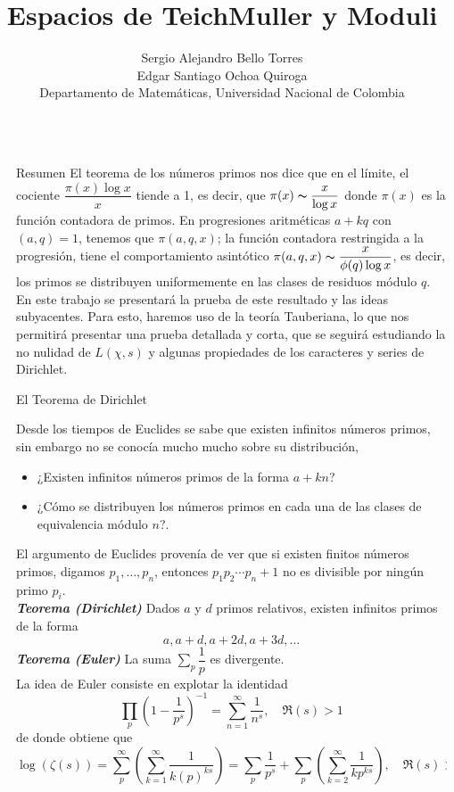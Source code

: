 \documentclass[final]{beamer}
\title{\Huge Espacios de TeichMuller y Moduli}
\author{\Large Sergio Alejandro Bello Torres\\Edgar Santiago Ochoa Quiroga\\Departamento de Matemáticas, Universidad Nacional de Colombia}
\newlength{\sepwidth}
\newlength{\colwidth}
\newcommand{\separatorcolumn}{\begin{column}{\sepwidth}\end{column}}
\newcommand{\defi}[1]{\textbf{\emph{#1}}}
\begin{document}
\Large
\begin{frame}[t,fragile]
\begin{columns}[t]
\separatorcolumn

\begin{column}{\colwidth}

\begin{block}{Resumen}
El teorema de los números primos nos dice que en el límite, el cociente $\dfrac{\pi(x)\log x}{x}$ tiende a 1, es decir, que $\pi(x)\thicksim \dfrac{x}{\log x}$ donde $\pi(x)$ es la función contadora de primos. En progresiones aritméticas $a+kq$ con $(a,q)=1$, tenemos que $\pi(a,q,x)$; la función contadora restringida a la progresión, tiene el comportamiento asintótico $\pi(a,q,x)\thicksim \dfrac{x}{\phi(q)\log x}$, es decir, los primos se distribuyen uniformemente en las clases de residuos módulo $q$. En este trabajo se presentará la prueba de este resultado y las ideas subyacentes. Para esto, haremos uso de la teoría Tauberiana, lo que nos permitirá presentar una prueba detallada y corta, que se seguirá estudiando la no nulidad de $L(\chi,s)$ y algunas propiedades de los caracteres y series de Dirichlet.
\end{block}

\begin{block}{El Teorema de Dirichlet}

Desde los tiempos de Euclides se sabe que existen infinitos números primos, sin embargo no se conocía mucho mucho sobre su distribución,
\begin{itemize}
    \item  ¿Existen infinitos números primos de la forma $a+kn$?
    \item ¿Cómo se distribuyen los números primos en cada  una de las clases de equivalencia módulo $n$?.
\end{itemize}
El argumento de Euclides provenía de ver que si existen finitos números primos, digamos $p_1,\ldots,p_n$, entonces $p_1p_2\cdots p_n+1$ no es divisible por ningún primo $p_i$.\\
\vspace*{0.3cm}
\defi{Teorema (Dirichlet)}
Dados $a$ y $d$ primos relativos, existen infinitos primos de la forma
    $$a, a+d,a+2d,a+3d,...$$
\defi{Teorema (Euler)} La suma $\displaystyle  \sum_{p}\dfrac{1}{p}$ es divergente.\\

La idea de Euler consiste en explotar la identidad 
$$\prod_p \left(1-\dfrac{1}{p^s}\right)^{-1}=\sum_{n=1}^{\infty}\dfrac{1}{n^s},\quad  \Re(s)>1$$
de donde obtiene que 
    $$
\log (\zeta(s))=\sum_p^{\infty}\left(\displaystyle\sum_{k=1}^{\infty} \dfrac{1}{k(p)^{k s}}\right)=\sum_p
\dfrac{1}{p^s}+\sum_{p}\left(\sum_{k=2}^{\infty}\dfrac{1}{kp^{ks}}\right), \quad \Re(s)>1$$
\end{block}
    

\end{column}
\end{columns}
\end{frame}
\end{document}
